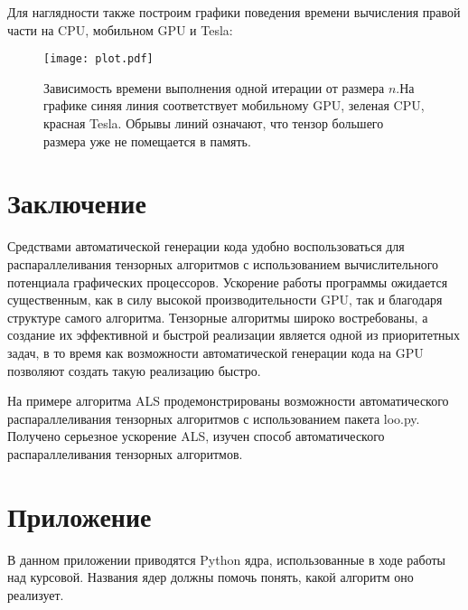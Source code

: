 \documentclass{scrartcl}
\begin{document}
Для наглядности также построим графики поведения времени вычисления правой части
на CPU, мобильном GPU и Tesla:

\begin{center}

\begin{figure}[H]
\centering
\texttt{[image: plot.pdf]}
\caption{Зависимость времени выполнения одной итерации от размера $n$.На графике синяя линия соответствует мобильному GPU, зеленая CPU, красная Tesla. Обрывы линий означают, что тензор большего размера уже не помещается в память.}
\end{figure}
\end{center}
\section{Заключение}
\label{sec-11}

Средствами автоматической генерации кода удобно воспользоваться для распараллеливания
тензорных алгоритмов с использованием вычислительного потенциала графических процессоров.
Ускорение работы программы ожидается существенным, как в силу высокой производительности GPU,
так и благодаря структуре самого алгоритма. Тензорные алгоритмы широко востребованы,
а создание их эффективной и быстрой реализации является одной из приоритетных задач,
в то время как возможности автоматической генерации кода на GPU позволяют создать такую 
реализацию быстро.

На примере алгоритма ALS продемонстрированы возможности автоматического 
распараллеливания тензорных алгоритмов с использованием пакета loo.py. 
Получено серьезное ускорение ALS, изучен способ автоматического распараллеливания
тензорных алгоритмов.
\section{Приложение}
\label{sec-12}

В данном приложении приводятся Python ядра, использованные в ходе работы
над курсовой. Названия ядер должны помочь понять, какой алгоритм оно реализует.
\end{document}
